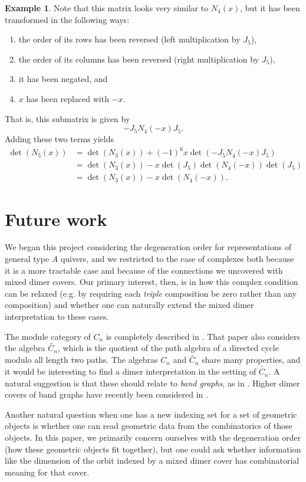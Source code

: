 \documentclass{amsart}
\theoremstyle{definition}
\newtheorem{example}[theorem]{Example}
\begin{document}
\begin{example}
Note that this matrix looks very similar to $N_4(x)$, but it has been transformed in the following ways:
\begin{enumerate}
    \item the order of its rows has been reversed (left multiplication by $J_5$),
    \item the order of its columns has been reversed (right multiplication by $J_5$),
    \item it has been negated, and
    \item $x$ has been replaced with $-x$.
\end{enumerate}
That is, this submatrix is given by \[-J_5N_4(-x)J_5.\] Adding these two terms yields
\begin{align*}
    \det(N_5(x))&=\det(N_3(x))+(-1)^{6}x\det(-J_5N_4(-x)J_5)\\
    &=\det(N_3(x))-x\det(J_5)\det(N_4(-x))\det(J_5)\\
    &=\det(N_3(x))-x\det(N_4(-x)).
\end{align*}
\end{example}


\section{Future work}
\label{sec:futurework}

We began this project considering the degeneration order for representations of general
type $A$ quivers, and we restricted to the case of complexes both because it is a more
tractable case and because of the connections we uncovered with mixed dimer covers.
Our primary interest, then, is in how this complex condition can be relaxed (e.g.
by requiring each \emph{triple} composition be zero rather than any composition) and whether one can naturally
extend the mixed dimer interpretation to these cases.

The module category of $C_n$ is completely described in \cite{Schemes}. That paper also considers the algebra $\widetilde{C_n}$, which is the quotient of the path algebra of a directed cycle modulo all length two paths. The algebras $C_n$ and $\widetilde{C_n}$ share many properties, and it would be interesting to find a dimer interpretation in the setting of $\widetilde{C_n}$. A natural suggestion is that these should relate to \emph{band graphs}, as in \cite{musiker2013bases}. Higher dimer covers of band graphs have recently been considered in \cite{kang2026higherqcontinuedfractionsdimers}.

Another natural question when one has a new indexing set for a set of geometric objects
is whether one can read geometric data from the combinatorics of those
objects. In this paper, we primarily concern ourselves with the degeneration order (how
these geometric objects fit together), but one could ask whether information like the
dimension of the orbit indexed by a mixed dimer cover has combinatorial meaning for that cover.
\end{document}

